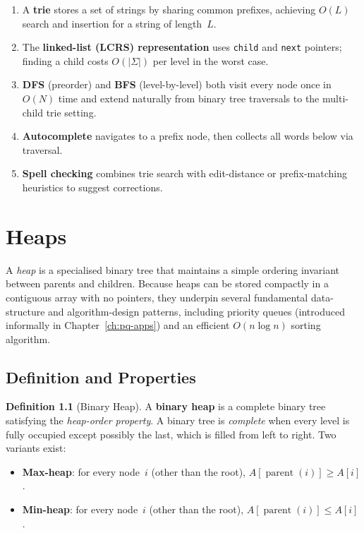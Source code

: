 \documentclass[11pt, a4paper, notitlepage]{report}
\theoremstyle{definition}
\newtheorem{definition}[theorem]{Definition}
\theoremstyle{remark}
\theoremstyle{definition}
\begin{document}
\begin{keyresult}[title={Key Result: Trie Operations}]
\begin{enumerate}
  \item A \textbf{trie} stores a set of strings by sharing common prefixes,
        achieving $O(L)$ search and insertion for a string of length~$L$.
  \item The \textbf{linked-list (LCRS) representation} uses \texttt{child}
        and \texttt{next} pointers; finding a child costs $O(|\Sigma|)$ per
        level in the worst case.
  \item \textbf{DFS} (preorder) and \textbf{BFS} (level-by-level) both visit
        every node once in $O(N)$ time and extend naturally from binary tree
        traversals to the multi-child trie setting.
  \item \textbf{Autocomplete} navigates to a prefix node, then collects all
        words below via traversal.
  \item \textbf{Spell checking} combines trie search with edit-distance or
        prefix-matching heuristics to suggest corrections.
\end{enumerate}
\end{keyresult}

\chapter{Heaps}
\label{ch:heaps}

A \emph{heap} is a specialised binary tree that maintains a simple ordering invariant between parents and children.  Because heaps can be stored compactly in a contiguous array with no pointers, they underpin several fundamental data-structure and algorithm-design patterns, including priority queues (introduced informally in Chapter~\ref{ch:pq-apps}) and an efficient $O(n\log n)$ sorting algorithm.

\section{Definition and Properties}
\label{sec:heap-def}

\begin{definition}[Binary Heap]
\label{def:binary-heap}
A \textbf{binary heap} is a complete binary tree satisfying the \emph{heap-order property}.  A binary tree is \emph{complete} when every level is fully occupied except possibly the last, which is filled from left to right.  Two variants exist:
\begin{itemize}
  \item \textbf{Max-heap}: for every node~$i$ (other than the root), $A[\operatorname{parent}(i)] \ge A[i]$.
  \item \textbf{Min-heap}: for every node~$i$ (other than the root), $A[\operatorname{parent}(i)] \le A[i]$.
\end{itemize}
\end{definition}
\end{document}
